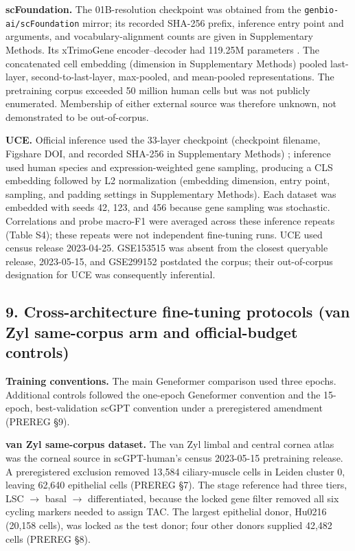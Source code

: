 \documentclass[12pt,letterpaper]{article}
\begin{document}
\textbf{scFoundation.} The 01B-resolution checkpoint was obtained from the \texttt{genbio-\allowbreak ai/\allowbreak scFoundation} mirror; its recorded SHA-256 prefix, inference entry point and arguments, and vocabulary-alignment counts are given in Supplementary Methods. Its xTrimoGene encoder--decoder had 119.25M parameters \cite{scfoundation2024}. The concatenated cell embedding (dimension in Supplementary Methods) pooled last-layer, second-to-last-layer, max-pooled, and mean-pooled representations. The pretraining corpus exceeded 50 million human cells but was not publicly enumerated. Membership of either external source was therefore unknown, not demonstrated to be out-of-corpus.

\textbf{UCE.} Official inference used the 33-layer checkpoint (checkpoint filename, Figshare DOI, and recorded SHA-256 in Supplementary Methods) \cite{rosen2026uce}; inference used human species and expression-weighted gene sampling, producing a CLS embedding followed by L2 normalization (embedding dimension, entry point, sampling, and padding settings in Supplementary Methods). Each dataset was embedded with seeds 42, 123, and 456 because gene sampling was stochastic. Correlations and probe macro-F1 were averaged across these inference repeats (Table S4); these repeats were not independent fine-tuning runs. UCE used census release 2023-04-25. GSE153515 was absent from the closest queryable release, 2023-05-15, and GSE299152 postdated the corpus; their out-of-corpus designation for UCE was consequently inferential.

\subsection*{9. Cross-architecture fine-tuning protocols (van Zyl same-corpus arm and official-budget controls)}

\textbf{Training conventions.} The main Geneformer comparison used three epochs. Additional controls followed the one-epoch Geneformer convention \cite{theodoris2023} and the 15-epoch, best-validation scGPT convention \cite{cui2024scgpt} under a preregistered amendment (PREREG \S9).

\textbf{van Zyl same-corpus dataset.} The van Zyl limbal and central cornea atlas \cite{vanzyl2022} was the corneal source in scGPT-human's census 2023-05-15 pretraining release. A preregistered exclusion removed 13,584 ciliary-muscle cells in Leiden cluster 0, leaving 62,640 epithelial cells (PREREG \S7). The stage reference had three tiers, LSC $\rightarrow$ basal $\rightarrow$ differentiated, because the locked gene filter removed all six cycling markers needed to assign TAC. The largest epithelial donor, Hu0216 (20,158 cells), was locked as the test donor; four other donors supplied 42,482 cells (PREREG \S8).
\end{document}
